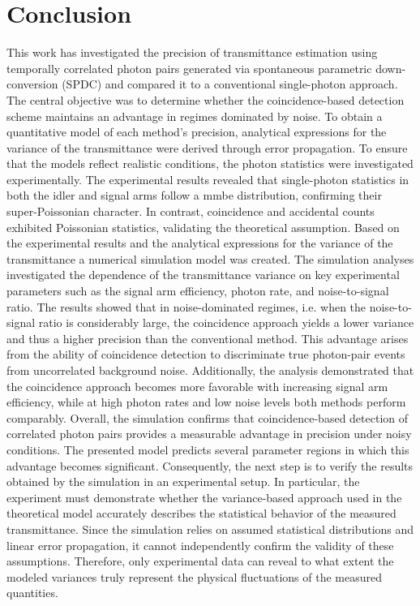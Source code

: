 \section{Conclusion}
This work has investigated the precision of transmittance estimation using temporally correlated photon pairs generated via spontaneous parametric down-conversion (SPDC) and compared it to a conventional single-photon approach. The central objective was to determine whether the coincidence-based detection scheme maintains an advantage in regimes dominated by noise. \newline
To obtain a quantitative model of each method’s precision, analytical expressions for the variance of the transmittance were derived through error propagation. To ensure that the models reflect realistic conditions, the photon statistics were investigated experimentally. \newline
The experimental results revealed that single-photon statistics in both the idler and signal arms follow a \acrshort{mmbe} distribution, confirming their super-Poissonian character. In contrast, coincidence and accidental counts exhibited Poissonian statistics, validating the theoretical assumption. Based on the experimental results and the analytical expressions for the variance of the transmittance a numerical simulation model was created. \newline
The simulation analyses investigated the dependence of the transmittance variance on key experimental parameters such as the signal arm efficiency, photon rate, and noise-to-signal ratio. The results showed that in noise-dominated regimes, i.e. when the noise-to-signal ratio is considerably large, the coincidence approach yields a lower variance and thus a higher precision than the conventional method. This advantage arises from the ability of coincidence detection to discriminate true photon-pair events from uncorrelated background noise. Additionally, the analysis demonstrated that the coincidence approach becomes more favorable with increasing signal arm efficiency, while at high photon rates and low noise levels both methods perform comparably. \newline
Overall, the simulation confirms that coincidence-based detection of correlated photon pairs provides a measurable advantage in precision under noisy conditions. The presented model predicts several parameter regions in which this advantage becomes significant. Consequently, the next step is to verify the results obtained by the simulation in an experimental setup. In particular, the experiment must demonstrate whether the variance-based approach used in the theoretical model accurately describes the statistical behavior of the measured transmittance. Since the simulation relies on assumed statistical distributions and linear error propagation, it cannot independently confirm the validity of these assumptions. Therefore, only experimental data can reveal to what extent the modeled variances truly represent the physical fluctuations of the measured quantities. \newline
